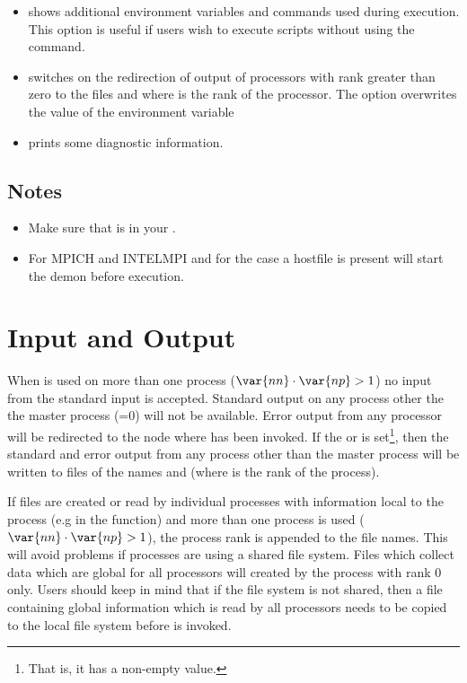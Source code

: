 \begin{itemize}
 \item[\programopt{-e}] shows additional environment variables and commands used during  execution. This option is useful if users wish to execute scripts without using the  command.

 \item[\programopt{-o}] switches on the redirection of output of processors with \MPI rank greater than zero to the files  and  where  is the rank of the processor. The option overwrites the value of the  environment variable 


 \item[\programopt{-v}] prints some diagnostic information.
\end{itemize}
\subsection{Notes}
\begin{itemize}
 \item Make sure that  is in your . 
 \item For MPICH and INTELMPI and for the case a hostfile is present 
 will start the  demon before execution.
\end{itemize}

\section{Input and Output}
When \MPI is used on more than one process ($\var{nn} \cdot \var{np} >1$) no input from the standard input is accepted. Standard output on any process other the the master process (=0) will not be available.
Error output from any processor will be redirected to the node where  has been invoked.
If the  or  is set\footnote{That is, it has a non-empty value.}, then the standard and error output from any process other than the master process will be written to files of the names  and  (where 
 is the rank of the process).

If files are created or read by individual \MPI processes with information local to the process (e.g in the  function)  and more than one process is used ($\var{nn} \cdot \var{np} >1$), the \MPI process rank is appended to the file names.
This will avoid problems if processes are using a shared file system.
Files which collect data which are global for all \MPI processors will created by the process with \MPI rank 0 only.
Users should keep in mind that if the file system is not shared, then a file containing global information
which is read by all processors needs to be copied to the local file system before  is invoked.
 

